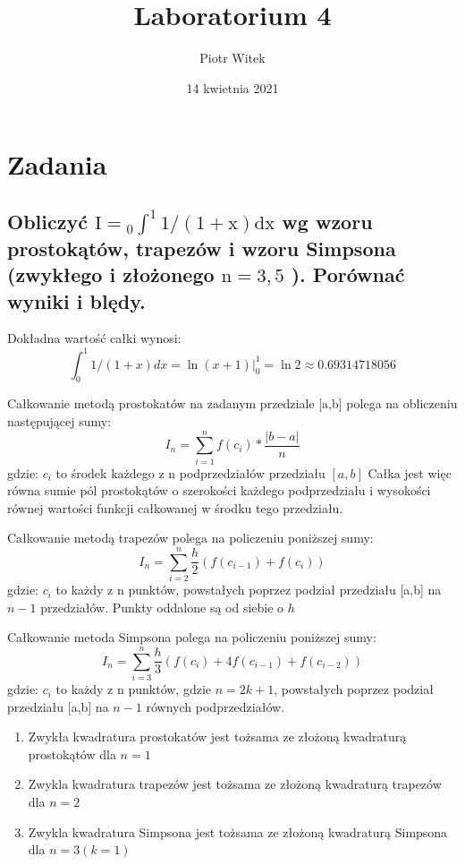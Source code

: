 \documentclass[5]{article}
\title{Laboratorium 4}
\author{Piotr Witek}
\date{14 kwietnia 2021}
\begin{document}

\maketitle

\section{Zadania}

\subsection{Obliczyć $\mathrm{I}={ }_{0} \int^{1} 1 /(1+\mathrm{x}) \mathrm{dx}$ wg wzoru prostokątów, trapezów i wzoru Simpsona (zwykłego i złożonego $\mathrm{n}=3,5$ ). Porównać wyniki i blędy. }

Dokładna wartość całki wynosi:
$$
\int_{0}^{1} 1 /(1+x) d x=\left.\ln (x+1)\right|_{0} ^{1}=\ln 2 \approx 0.69314718056
$$
\newline

Całkowanie metodą prostokatów na zadanym przedziale [a,b] polega na obliczeniu następującej sumy:
$$
I_{n}=\sum_{i=1}^{n} f\left(c_{i}\right) * \frac{|b-a|}{n}
$$
gdzie: $c_{i}$ to środek każdego z n podprzedziałów przedziału $[a,b]$
Całka jest więc równa sumie pól prostokątów o szerokości każdego podprzedziału i wysokości równej wartości funkcji całkowanej w środku tego przedziału.
\newline

Całkowanie metodą trapezów polega na policzeniu poniższej sumy:
$$
I_{n}=\sum_{i=2}^{n} \frac{h}{2}\left(f\left(c_{i-1}\right)+f\left(c_{i}\right)\right)
$$
gdzie: $c_{i}$ to każdy z n punktów, powstałych poprzez podział przedziału [a,b] na $n-1$ przedziałów. Punkty oddalone są od siebie o $h$
\newline

Całkowanie metoda Simpsona polega na policzeniu poniższej sumy:
$$
I_{n}=\sum_{i=3}^{n} \frac{h}{3}\left(f\left(c_{i}\right)+4 f\left(c_{i-1}\right)+f\left(c_{i-2}\right)\right)
$$
gdzie: $c_{i}$ to każdy z n punktów, gdzie $n=2k+1$, powstałych poprzez podział przedziału [a,b] na $n-1$ równych podprzedziałów.
\newline


\begin{enumerate}
    \item Zwykła kwadratura prostokatów jest tożsama ze złożoną kwadraturą prostokątów dla $n=1$
    \item Zwykla kwadratura trapezów jest tożsama ze złożoną kwadraturą trapezów dla $n=2$
    \item Zwykla kwadratura Simpsona jest tożsama ze złożoną kwadraturą Simpsona dla $n=3(k=1)$
\end{enumerate}
\end{document}
